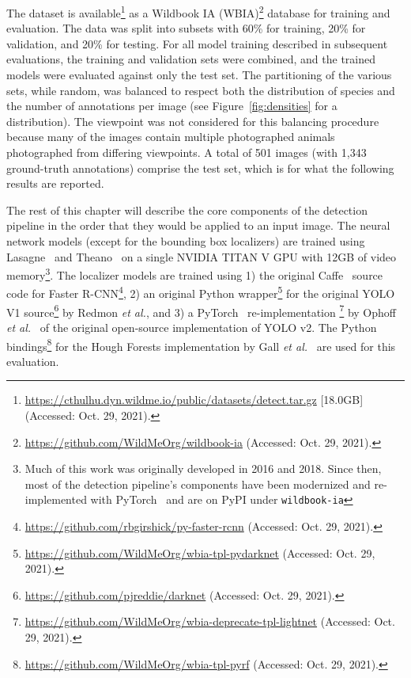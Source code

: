 The dataset is available\footnote{\url{https://cthulhu.dyn.wildme.io/public/datasets/detect.tar.gz} [18.0GB] (Accessed: Oct. 29, 2021).} as a Wildbook IA (WBIA)\footnote{\url{https://github.com/WildMeOrg/wildbook-ia} (Accessed: Oct. 29, 2021).} database for training and evaluation.  The data was split into subsets with 60\% for training, 20\% for validation, and 20\% for testing.  For all model training described in subsequent evaluations, the training and validation sets were combined, and the trained models were evaluated against only the test set.  The partitioning of the various sets, while random, was balanced to respect both the distribution of species and the number of annotations per image (see Figure~\ref{fig:densities} for a distribution).  The viewpoint was not considered for this balancing procedure because many of the images contain multiple photographed animals photographed from differing viewpoints.  A total of 501 images (with 1,343 ground-truth annotations) comprise the test set, which is for what the following results are reported.

The rest of this chapter will describe the core components of the detection pipeline in the order that they would be applied to an input image. The neural network models (except for the bounding box localizers) are trained using Lasagne~\cite{dieleman_lasagne_2015} and Theano~\cite{bergstra_theano:_2010,bastien_theano:_2012} on a single NVIDIA TITAN V GPU with 12GB of video memory\footnote{Much of this work was originally developed in 2016 and 2018.  Since then, most of the detection pipeline's components have been modernized and re-implemented with PyTorch~\cite{paszke_pytorch_2019} and are on PyPI under \texttt{wildbook-ia}}.  The localizer models are trained using 1) the original Caffe~\cite{jia_caffe:_2014} source code for Faster R-CNN\footnote{\url{https://github.com/rbgirshick/py-faster-rcnn} (Accessed: Oct. 29, 2021).}, 2) an original Python wrapper\footnote{\url{https://github.com/WildMeOrg/wbia-tpl-pydarknet} (Accessed: Oct. 29, 2021).} for the original YOLO V1 source\footnote{\url{https://github.com/pjreddie/darknet} (Accessed: Oct. 29, 2021).} by Redmon \textit{et al.}, and 3) a PyTorch~\cite{paszke_pytorch_2019} re-implementation \footnote{\url{https://github.com/WildMeOrg/wbia-deprecate-tpl-lightnet} (Accessed: Oct. 29, 2021).} by Ophoff \textit{et al.}~\cite{ophoff_lightnet_2018} of the original open-source implementation of YOLO v2.  The Python bindings\footnote{\url{https://github.com/WildMeOrg/wbia-tpl-pyrf} (Accessed: Oct. 29, 2021).} for the Hough Forests implementation by Gall \textit{et al.}~\cite{gall_hough_2011} are used for this evaluation.

